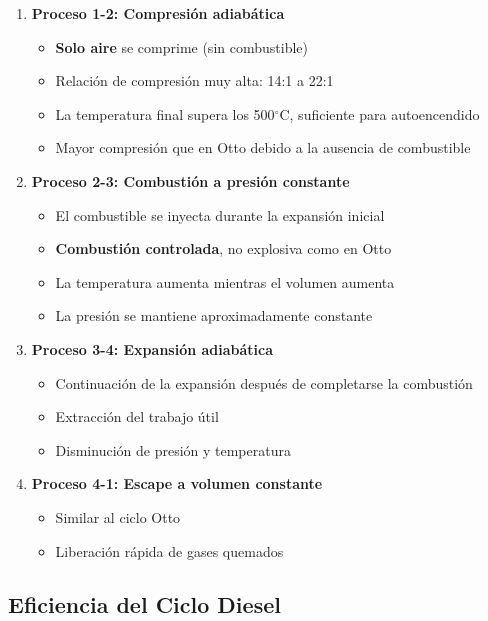 \documentclass{article}
\begin{document}
\begin{enumerate}
    \item \textbf{Proceso 1-2: Compresión adiabática}
    \begin{itemize}
        \item \textbf{Solo aire} se comprime (sin combustible)
        \item Relación de compresión muy alta: 14:1 a 22:1
        \item La temperatura final supera los 500$^\circ$C, suficiente para autoencendido
        \item Mayor compresión que en Otto debido a la ausencia de combustible
    \end{itemize}
    
    \item \textbf{Proceso 2-3: Combustión a presión constante}
    \begin{itemize}
        \item El combustible se inyecta durante la expansión inicial
        \item \textbf{Combustión controlada}, no explosiva como en Otto
        \item La temperatura aumenta mientras el volumen aumenta
        \item La presión se mantiene aproximadamente constante
    \end{itemize}
    
    \item \textbf{Proceso 3-4: Expansión adiabática}
    \begin{itemize}
        \item Continuación de la expansión después de completarse la combustión
        \item Extracción del trabajo útil
        \item Disminución de presión y temperatura
    \end{itemize}
    
    \item \textbf{Proceso 4-1: Escape a volumen constante}
    \begin{itemize}
        \item Similar al ciclo Otto
        \item Liberación rápida de gases quemados
    \end{itemize}
\end{enumerate}

\subsection*{Eficiencia del Ciclo Diesel}
\end{document}
